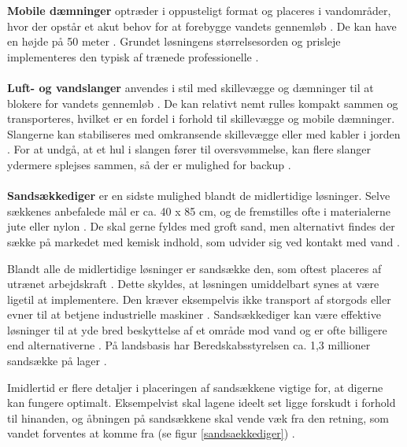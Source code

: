 \textbf{Mobile dæmninger} optræder i oppusteligt format og placeres i vandområder, hvor der opstår et akut behov for at forebygge vandets gennemløb \cite{mobiledams}. De kan have en højde på 50 meter \cite{barrierekatalog}. Grundet løsningens størrelsesorden og prisleje implementeres den typisk af trænede professionelle \cite{fema2013}. 
\\\\
\textbf{Luft- og vandslanger} anvendes i stil med skillevægge og dæmninger til at blokere for vandets gennemløb \cite{flooddefensegroup}. De kan relativt nemt rulles kompakt sammen og transporteres, hvilket er en fordel i forhold til skillevægge og mobile dæmninger. Slangerne kan stabiliseres med omkransende skillevægge eller med kabler i jorden \cite{barrierekatalog}. For at undgå, at et hul i slangen fører til oversvømmelse, kan flere slanger ydermere splejses sammen, så der er mulighed for backup \cite{floodcontrolinternational}. 
\\\\
\textbf{Sandsækkediger} er en sidste mulighed blandt de midlertidige løsninger. Selve sækkenes anbefalede mål er ca. 40 x 85 cm, og de fremstilles ofte i materialerne jute eller nylon \cite{environmentagency2009}. De skal gerne fyldes med groft sand, men alternativt findes der sække på markedet med kemisk indhold, som udvider sig ved kontakt med vand \cite{barrierekatalog}. 
\par
Blandt alle de midlertidige løsninger er sandsække den, som oftest placeres af utrænet arbejdskraft \cite{fema2013}\cite{campbell2017}. Dette skyldes, at løsningen umiddelbart synes at være ligetil at implementere. Den kræver eksempelvis ikke transport af storgods eller evner til at betjene industrielle maskiner \cite{birch2018}. 
Sandsækkediger kan være effektive løsninger til at yde bred beskyttelse af et område mod vand og er ofte billigere end alternativerne \cite{environmentagency2009}. På landsbasis har Beredskabsstyrelsen ca. 1,3 millioner sandsække på lager \cite{brssandsaekke}. 
\par
Imidlertid er flere detaljer i placeringen af sandsækkene vigtige for, at digerne kan fungere optimalt. Eksempelvist skal lagene ideelt set ligge forskudt i forhold til hinanden, og åbningen på sandsækkene skal vende væk fra den retning, som vandet forventes at komme fra (se figur \ref{sandsaekkediger}) \cite{usarmysandbag}.

